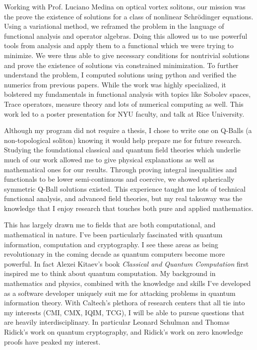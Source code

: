 \documentclass[11pt]{article}
\begin{document}
Working with Prof. Luciano Medina on optical vortex solitons, our mission was the prove the existence of solutions for a class of nonlinear Schr\"{o}dinger equations. Using a variational method, we reframed the problem in the language of functional analysis and operator algebras. Doing this allowed us to use powerful tools from analysis and apply them to a functional which we were trying to minimize. We were thus able to give necessary conditions for nontrivial solutions and prove the existence of solutions via constrained minimization. To further understand the problem, I computed solutions using python and verified the numerics from previous papers. While the work was highly specialized, it bolstered my fundamentals in functional analysis with topics like Sobolev spaces, Trace operators, measure theory and lots of numerical computing as well. This work led to a poster presentation for NYU faculty, and talk at Rice University.

Although my program did not require a thesis, I chose to write one on Q-Balls (a non-topological soliton) knowing it would help prepare me for future research. Studying the foundational classical and quantum field theories which underlie much of our work allowed me to give physical explanations as well as mathematical ones for our results. Through proving integral inequalities and functionals to be lower semi-continuous and coercive, we showed spherically symmetric Q-Ball solutions existed. This experience taught me lots of technical functional analysis, and advanced field theories, but my real takeaway was the knowledge that I enjoy research that touches both pure and applied mathematics.

This has largely drawn me to fields that are both computational, and mathematical in nature. I've been particularly fascinated with quantum information, computation and cryptography. I see these areas as being revolutionary in the coming decade as quantum computers become more powerful. In fact Alexei Kitaev's book \textit{Classical and Quantum Computation} first inspired me to think about quantum computation. My background in mathematics and physics, combined with the knowledge and skills I've developed as a software developer uniquely suit me for attacking problems in quantum information theory. With Caltech's plethora of research centers that all tie into my interests (CMI, CMX, IQIM, TCG), I will be able to pursue questions that are heavily interdisciplinary. In particular Leonard Schulman and Thomas Ridick's work on quantum cryptography, and Ridick's work on zero knowledge proofs have peaked my interest.  
\end{document}
